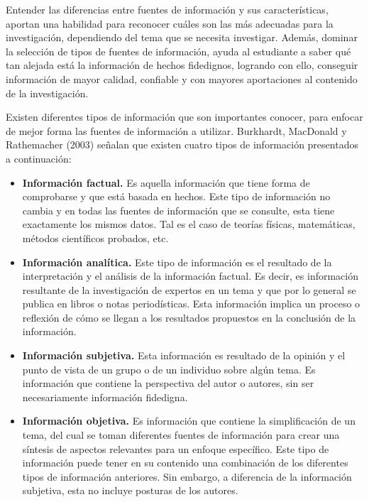 Entender las diferencias entre fuentes de información y sus características, aportan una habilidad para reconocer cuáles son las más adecuadas para la investigación, dependiendo del tema que se necesita investigar. Además, dominar la selección de tipos de fuentes de información, ayuda al estudiante a saber qué tan alejada está la información de hechos fidedignos, logrando con ello, conseguir información de mayor calidad, confiable y con mayores aportaciones al contenido de la investigación.

Existen diferentes tipos de información que son importantes conocer, para enfocar de mejor forma las fuentes de información a utilizar. Burkhardt, MacDonald y Rathemacher (2003) señalan que existen cuatro tipos de información presentados a continuación:

\begin{itemize}
  \item \textbf{Información factual.} Es aquella información que tiene forma de comprobarse y que está basada en hechos. Este tipo de información no cambia y en todas las fuentes de información que se consulte, esta tiene exactamente los mismos datos. Tal es el caso de teorías físicas, matemáticas, métodos científicos probados, etc.
  \item \textbf{Información analítica.} Este tipo de información es el resultado de la interpretación y el análisis de la información factual. Es decir, es información resultante de la investigación de expertos en un tema y que por lo general se publica en libros o notas periodísticas. Esta información implica un proceso o reflexión de cómo se llegan a los resultados propuestos en la conclusión de la información.
  \item \textbf{Información subjetiva.} Esta información es resultado de la opinión y el punto de vista de un grupo o de un individuo sobre algún tema. Es información que contiene la perspectiva del autor o autores, sin ser necesariamente información fidedigna.
  \item \textbf{Información objetiva.} Es información que contiene la simplificación de un tema, del cual se toman diferentes fuentes de información para crear una síntesis de aspectos relevantes para un enfoque específico. Este tipo de información puede tener en su contenido una combinación de los diferentes tipos de información anteriores. Sin embargo, a diferencia de la información subjetiva, esta no incluye posturas de los autores.
\end{itemize}

